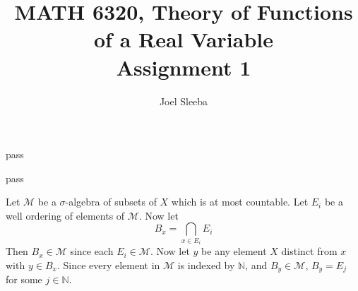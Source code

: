 \documentclass[12pt]{exam}
\theoremstyle{plain} %
\theoremstyle{definition} %
\theoremstyle{remark} %
\begin{document}
\title{MATH 6320, Theory of Functions of a Real Variable \\ Assignment 1}

\author{
Joel Sleeba \\
}

\maketitle
\printanswers
\unframedsolutions

\begin{questions}

  \question
  \begin{solution}
    pass
  \end{solution}

  \question
  \begin{solution}
    pass
  \end{solution}

  \question
  \begin{solution}
    Let $\mathcal{M}$ be a $\sigma$-algebra of subsets of $X$ which is at most countable. Let $E_i$ be a well ordering of elements of $\mathcal{M}$. Now let $$B_x = \bigcap_{x \in E_i }E_i$$
    Then $B_x \in \mathcal{M}$ since each $E_i \in \mathcal{M}$. Now let $y$ be any element $X$ distinct from $x$ with $y \in B_x$. Since every element in $\mathcal{M}$ is indexed by $\mathbb{N}$, and $B_y \in \mathcal{M}$, $B_y = E_j$ for some $j \in \mathbb{N}$.
  \end{solution}


\end{questions}
\printbibliography[heading=bibintoc]
\end{document}
